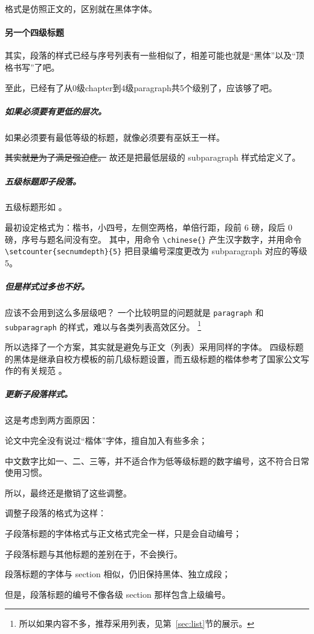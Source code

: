 \documentclass[../Main/thesis]{subfiles}
\begin{document}
格式是仿照正文的，区别就在黑体字体。

\paragraph{另一个四级标题} \label{spr:subpar}

其实，段落的样式已经与序号列表有一些相似了，相差可能也就是“黑体”以及“顶格书写”了吧。

至此，已经有了从0级chapter到4级paragraph共5个级别了，应该够了吧。

\subparagraph{如果必须要有更低的层次。\\}
如果必须要有最低等级的标题，就像必须要有巫妖王一样。

\sout{其实就是为了满足强迫症。}
故还是把最低层级的 subparagraph 样式给定义了。

\subparagraph{五级标题即子段落。}
五级标题形如 。

最初设定格式为：楷书，小四号，左侧空两格，单倍行距，段前 6 磅，段后 0 磅，序号与题名间没有空。
其中，用命令 \verb|\chinese{}| 产生汉字数字，并用命令 \verb|\setcounter{secnumdepth}{5}| 把目录编号深度更改为 subparagraph 对应的等级 5。

\subparagraph{但是样式过多也不好。}
应该不会用到这么多层级吧？
一个比较明显的问题就是 \verb|paragraph| 和 \verb|subparagraph| 的样式，难以与各类列表高效区分。
\footnote{所以如果内容不多，推荐采用列表，见第~\ref{sec:list}节的展示。}

所以选择了一个方案，其实就是避免与正文（列表）采用同样的字体。
四级标题的黑体是继承自校方模板的前几级标题设置，而五级标题的楷体参考了国家公文写作的有关规范 \cite{GBT9704}。

\subparagraph{更新子段落样式。}
这是考虑到两方面原因：
\begin{inlinecn}
  \item 论文中完全没有说过“楷体”字体，擅自加入有些多余；
  \item 中文数字比如一、二、三等，并不适合作为低等级标题的数字编号，这不符合日常使用习惯。
\end{inlinecn}
所以，最终还是撤销了这些调整。

调整子段落的格式为这样：
\begin{inline}
  \item 子段落标题的字体格式与正文格式完全一样，只是会自动编号；
  \item 子段落标题与其他标题的差别在于，不会换行。
  \item 段落标题的字体与 section 相似，仍旧保持黑体、独立成段；
  \item 但是，段落标题的编号不像各级 section 那样包含上级编号。
\end{inline}
\end{document}

